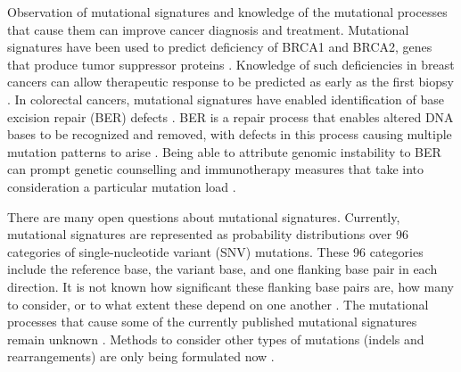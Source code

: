 \documentclass[12pt, letterpaper]{article}
\begin{document}
Observation of mutational signatures and knowledge of the mutational processes that cause them can improve cancer diagnosis and treatment. 
Mutational signatures have been used to predict deficiency of BRCA1 and BRCA2, genes that produce tumor suppressor proteins \citep{domchek2010association}.
Knowledge of such deficiencies in breast cancers can allow therapeutic response to be predicted as early as the first biopsy \citep{davies2017hrdetect}.
In colorectal cancers, mutational signatures have enabled identification of base excision repair (BER) defects \citep{pilati2017mutational}. 
BER is a repair process that enables altered DNA bases to be recognized and removed, with defects in this process causing multiple mutation patterns to arise \citep{helleday2014mechanisms}.
Being able to attribute genomic instability to BER can prompt genetic counselling and immunotherapy measures that take into consideration a particular mutation load \citep{pilati2017mutational}.

There are many open questions about mutational signatures. 
Currently, mutational signatures are represented as probability distributions over 96 categories of single-nucleotide variant (SNV) mutations.
These 96 categories include the reference base, the variant base, and one flanking base pair in each direction. 
It is not known how significant these flanking base pairs are, how many to consider, or to what extent these depend on one another \citep{shiraishi2015simple}.
The mutational processes that cause some of the currently published mutational signatures remain unknown \citep{alexandrov2013signatures}.
Methods to consider other types of mutations (indels and rearrangements) are only being formulated now \citep{zou2018validating}.
\end{document}
